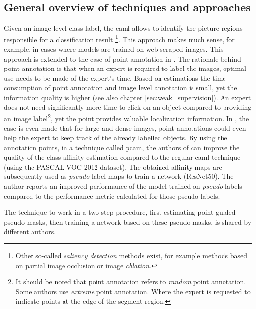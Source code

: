 \subsection{General overview of techniques and approaches}
\par{
    Given an image-level class label, the \Gls{caml} \cite{Selvaraju2020} allows to identify the picture regions responsible for a classification result \cite{Ahn2019}
    \footnote{Other so-called \textit{saliency detection} methods exist, for example methods based on partial image occlusion or image \textit{ablation}.}.
    This approach makes much sense, for example, in cases where models are trained on web-scraped images.
    This approach is extended to the case of point-annotation in \cite{McEver2020}. 
    The rationale behind point annotation is that when an expert is required to label the images, optimal use needs to be made of the expert's time.
    Based on estimations \cite{Bearman2015} the time consumption of point annotation and image level annotation is small, yet the information quality is higher (see also chapter \ref{sec:weak_supervision}).
    An expert does not need significantly more time to click on an object compared to providing an image label\footnote{
        It should be noted that point annotation refers to \textit{random} point annotation. Some authors \cite{Maninis2018} use \textit{extreme} point annotation. 
        Where the expert is requested to indicate points at the edge of the segment region.
    }, yet the point provides valuable localization information.
    In \cite{McEver2020}, the case is even made that for large and dense images, point annotations could even help the expert to keep track of the already labelled objects.
    By using the annotation points, in a technique called \acrfull{pcam}, the authors of \cite{McEver2020} can improve the quality of the class affinity estimation compared to the regular \Gls{caml} technique (using the PASCAL VOC 2012 dataset).
    The obtained affinity maps are subsequently used as \textit{pseudo} label maps to train a network (ResNet50). 
    The author reports an improved performance of the model trained on \textit{pseudo} labels compared to the performance metric calculated for those pseudo labels.
}
\par{
    The technique to work in a two-step procedure, first estimating point guided pseudo-masks, then training a network based on these pseudo-masks, is shared by different authors\cite{Laradji2019,Laradji2019a, Ahn2019,McEver2020}.
}
